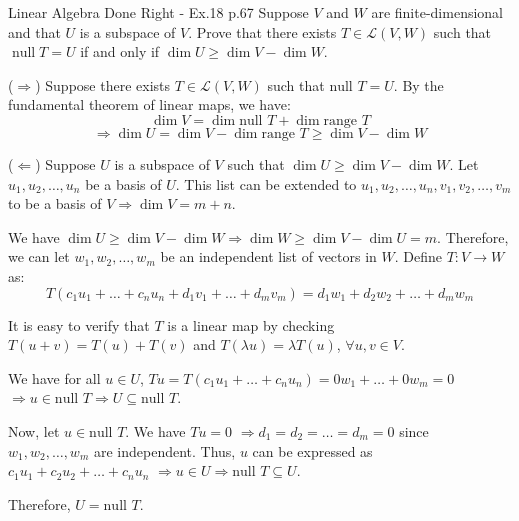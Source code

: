 \begin{problem}{}{}{Linear Algebra Done Right - Ex.18 p.67}
Suppose \(V\) and \(W\) are finite-dimensional and that \(U\) is a subspace
of \(V\). Prove that there exists \(T \in \mathcal{L}(V, W)\) such that
\(\operatorname{null} T = U\) if and only if
\(
\dim U \ge \dim V - \dim W.
\)
\end{problem}

\begin{solution}
($\Rightarrow$) Suppose there exists $T \in \mathcal{L}(V,W)$ such that $\text{null } T = U$. 
By the fundamental theorem of linear maps, we have:
\[ \dim V = \dim \text{null } T + \dim \text{range } T \]
\[ \Rightarrow \dim U = \dim V - \dim \text{range } T \ge \dim V - \dim W \]

($\Leftarrow$) Suppose $U$ is a subspace of $V$ such that $\dim U \ge \dim V - \dim W$.
Let $u_1, u_2, \dots, u_n$ be a basis of $U$. 
This list can be extended to $u_1, u_2, \dots, u_n, v_1, v_2, \dots, v_m$ 
to be a basis of $V \Rightarrow \dim V = m + n$.

We have $\dim U \ge \dim V - \dim W \Rightarrow \dim W \ge \dim V - \dim U = m$.
Therefore, we can let $w_1, w_2, \dots, w_m$ be an independent list of vectors in $W$.
Define $T: V \to W$ as:
\[ T(c_1u_1 + \dots + c_nu_n + d_1v_1 + \dots + d_mv_m) = d_1w_1 + d_2w_2 + \dots + d_mw_m \]

It is easy to verify that $T$ is a linear map by checking $T(u+v) = T(u)+T(v)$ 
and $T(\lambda u) = \lambda T(u)$, $\forall u,v \in V$.

We have for all $u \in U$, 
$Tu = T(c_1u_1 + \dots + c_nu_n) = 0w_1 + \dots + 0w_m = 0$
$\Rightarrow u \in \text{null } T \Rightarrow U \subseteq \text{null } T$.

Now, let $u \in \text{null } T$. We have $Tu = 0$
$\Rightarrow d_1 = d_2 = \dots = d_m = 0$ since $w_1, w_2, \dots, w_m$ are independent.
Thus, $u$ can be expressed as $c_1u_1 + c_2u_2 + \dots + c_nu_n$ 
$\Rightarrow u \in U \Rightarrow \text{null } T \subseteq U$.

Therefore, $U = \text{null } T$.
\end{solution}